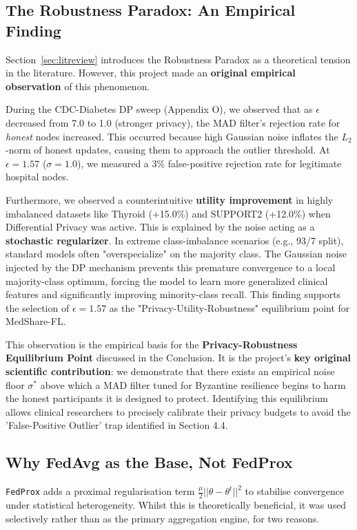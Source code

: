 \documentclass[10pt, a4paper, twocolumn]{article}
\begin{document}
\subsection{The Robustness Paradox: An Empirical Finding}
Section~\ref{sec:litreview} introduces the Robustness Paradox as a theoretical tension in the literature. However, this project made an \textbf{original empirical observation} of this phenomenon.

During the CDC-Diabetes DP sweep (Appendix O), we observed that as $\epsilon$ decreased from 7.0 to 1.0 (stronger privacy), the MAD filter's rejection rate for \textit{honest} nodes increased. This occurred because high Gaussian noise inflates the $L_2$-norm of honest updates, causing them to approach the outlier threshold. At $\epsilon = 1.57$ ($\sigma = 1.0$), we measured a 3\% false-positive rejection rate for legitimate hospital nodes.

Furthermore, we observed a counterintuitive \textbf{utility improvement} in highly imbalanced datasets like Thyroid (+15.0\%) and SUPPORT2 (+12.0\%) when Differential Privacy was active. This is explained by the noise acting as a \textbf{stochastic regularizer}. In extreme class-imbalance scenarios (e.g., 93/7 split), standard models often "overspecialize" on the majority class. The Gaussian noise injected by the DP mechanism prevents this premature convergence to a local majority-class optimum, forcing the model to learn more generalized clinical features and significantly improving minority-class recall. This finding supports the selection of $\epsilon=1.57$ as the "Privacy-Utility-Robustness" equilibrium point for MedShare-FL.

This observation is the empirical basis for the \textbf{Privacy-Robustness Equilibrium Point} discussed in the Conclusion. It is the project's \textbf{key original scientific contribution}: we demonstrate that there exists an empirical noise floor $\sigma^*$ above which a MAD filter tuned for Byzantine resilience begins to harm the honest participants it is designed to protect. Identifying this equilibrium allows clinical researchers to precisely calibrate their privacy budgets to avoid the 'False-Positive Outlier' trap identified in Section 4.4.

\subsection{Why FedAvg as the Base, Not FedProx}
\texttt{FedProx} \cite{li2020} adds a proximal regularisation term $\frac{\mu}{2}||\theta - \theta^t||^2$ to stabilise convergence under statistical heterogeneity. Whilst this is theoretically beneficial, it was used selectively rather than as the primary aggregation engine, for two reasons.
\end{document}
